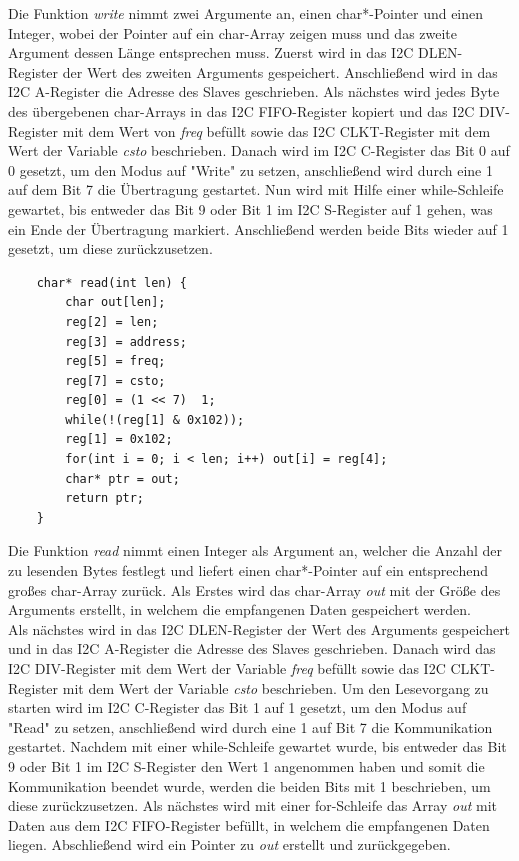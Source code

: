 \documentclass[12pt]{article}
\begin{document}
\vspace{-2mm}
Die Funktion \textit{write} nimmt zwei Argumente an, einen char*-Pointer und einen Integer, wobei der Pointer auf ein char-Array zeigen muss und das zweite Argument dessen Länge entsprechen muss. Zuerst wird in das I2C DLEN-Register der Wert des zweiten Arguments gespeichert. Anschließend wird in das I2C A-Register die Adresse des Slaves geschrieben. Als nächstes wird jedes Byte des übergebenen char-Arrays in das I2C FIFO-Register kopiert und das I2C DIV-Register mit dem Wert von \textit{freq} befüllt sowie das I2C CLKT-Register mit dem Wert der Variable \textit{csto} beschrieben. Danach wird im I2C C-Register das Bit 0 auf 0 gesetzt, um den Modus auf "Write" zu setzen, anschließend wird durch eine 1 auf dem Bit 7 die Übertragung gestartet. Nun wird mit Hilfe einer while-Schleife gewartet, bis entweder das Bit 9 oder Bit 1 im I2C S-Register auf 1 gehen, was ein Ende der Übertragung markiert. Anschließend werden beide Bits wieder auf 1 gesetzt, um diese zurückzusetzen.\\
\begin{verbatim}
    char* read(int len) {
        char out[len];
        reg[2] = len;
        reg[3] = address;
        reg[5] = freq;
        reg[7] = csto;
        reg[0] = (1 << 7)  1;
        while(!(reg[1] & 0x102));
        reg[1] = 0x102;
        for(int i = 0; i < len; i++) out[i] = reg[4];
        char* ptr = out;
        return ptr;
    }
\end{verbatim}
\vspace{-2mm}
Die Funktion \textit{read} nimmt einen Integer als Argument an, welcher die Anzahl der zu lesenden Bytes festlegt und liefert einen char*-Pointer auf ein entsprechend großes char-Array zurück. Als Erstes wird das char-Array \textit{out} mit der Größe des Arguments erstellt, in welchem die empfangenen Daten gespeichert werden.\\
Als nächstes wird in das I2C DLEN-Register der Wert des Arguments gespeichert und in das I2C A-Register die Adresse des Slaves geschrieben. Danach wird das I2C DIV-Register mit dem Wert der Variable \textit{freq} befüllt sowie das I2C CLKT-Register mit dem Wert der Variable \textit{csto} beschrieben. Um den Lesevorgang zu starten wird im I2C C-Register das Bit 1 auf 1 gesetzt, um den Modus auf "Read" zu setzen, anschließend wird durch eine 1 auf Bit 7 die Kommunikation gestartet. Nachdem mit einer while-Schleife gewartet wurde, bis entweder das Bit 9 oder Bit 1 im I2C S-Register den Wert 1 angenommen haben und somit die Kommunikation beendet wurde, werden die beiden Bits mit 1 beschrieben, um diese zurückzusetzen. Als nächstes wird mit einer for-Schleife das Array \textit{out} mit Daten aus dem I2C FIFO-Register befüllt, in welchem die empfangenen Daten liegen. Abschließend wird ein Pointer zu \textit{out} erstellt und zurückgegeben.\\
\end{document}
